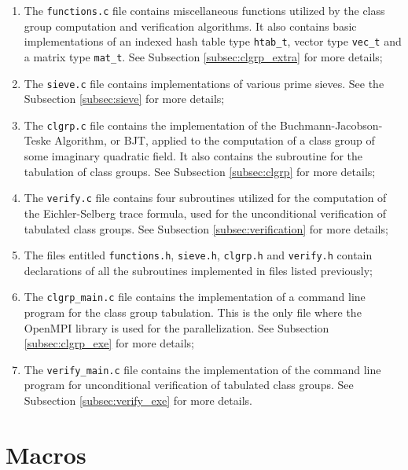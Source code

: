 \documentclass[a4paper,10pt]{article}
\newcommand{\code}{\lstinline}
\begin{document}
\begin{enumerate}
\item The \code{functions.c} file contains miscellaneous functions utilized by the class group computation and verification algorithms. It also contains basic implementations of an indexed hash table type \code{htab_t}, vector type \code{vec_t} and a matrix type \code{mat_t}. See Subsection \ref{subsec:clgrp_extra} for more details;

\item The \code{sieve.c} file contains implementations of various prime sieves. See the Subsection \ref{subsec:sieve} for more details;

\item The \code{clgrp.c} file contains the implementation of the Buchmann-Jacobson-Teske Algorithm, or BJT, applied to the computation of a class group of some imaginary quadratic field. It also contains the subroutine for the tabulation of class groups. See Subsection \ref{subsec:clgrp} for more details;

\item The \code{verify.c} file contains four subroutines utilized for the computation of the Eichler-Selberg trace formula, used for the unconditional verification of tabulated class groups. See Subsection \ref{subsec:verification} for more details;

\item The files entitled \code{functions.h}, \code{sieve.h}, \code{clgrp.h} and \code{verify.h} contain declarations of all the subroutines implemented in files listed previously;

\item The \code{clgrp_main.c} file contains the implementation of a command line program for the class group tabulation. This is the only file where the OpenMPI library is used for the parallelization. See Subsection \ref{subsec:clgrp_exe} for more details;

\item The \code{verify_main.c} file contains the implementation of the command line program for unconditional verification of tabulated class groups. See Subsection \ref{subsec:verify_exe} for more details.
\end{enumerate}





\section{Macros} \label{subsec:clgrp_macros}
\end{document}
